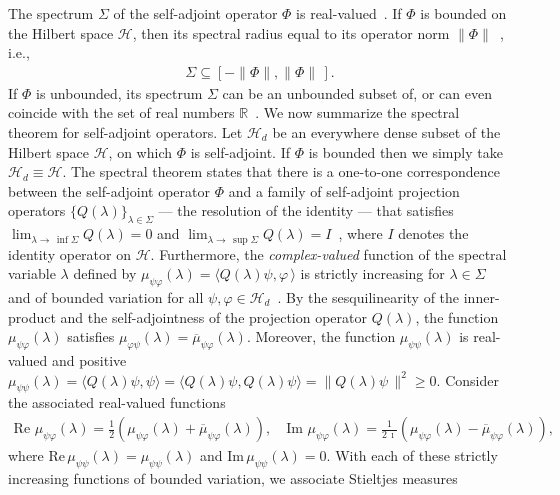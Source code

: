 \documentclass[leqno,onefignum,onetabnum]{siamltex1213}
\newcommand\Real{\mbox{Re}\,} %
\newcommand\Imag{\mbox{Im}\,} %
\newcommand{\Hs}{\mathscr{H}}
\begin{document}
The spectrum $\Sigma$ of the self-adjoint operator $\Phi$ is
real-valued~\cite{Reed-1980,Stone:64}. If $\Phi$ is bounded on the
Hilbert space $\Hs$, then its spectral radius equal to its operator
norm $\|\Phi\|$~\cite{Reed-1980}, i.e.,
%
\begin{align}\label{eq:Spectral_Radius_Phi}
  \Sigma\subseteq[-\|\Phi\|,\|\Phi\|\,].
\end{align}
%
If $\Phi$ is unbounded, its spectrum $\Sigma$ can be an unbounded subset of,
or can even coincide with the set of real numbers
$\mathbb{R}$~\cite{Stone:64}. 
We now summarize the spectral theorem for self-adjoint operators. Let
$\Hs_d$ be an everywhere dense subset of the Hilbert space $\Hs$, on
which $\Phi$ is self-adjoint. If $\Phi$ is 
bounded then we simply take $\Hs_d\equiv\Hs$. The spectral theorem states that
there is a one-to-one correspondence between the self-adjoint
operator $\Phi$ and a family of self-adjoint projection operators
$\{Q(\lambda)\}_{\lambda\in\Sigma}$ --- the resolution of the identity --- that satisfies
$\lim_{\lambda\to\,\inf{\Sigma}}Q(\lambda)=0$ and
$\lim_{\lambda\to\,\sup{\Sigma}}Q(\lambda)=I$~\cite{Stone:64}, where $I$ denotes the 
identity operator on $\Hs$. Furthermore, the \emph{complex-valued}
function of the spectral variable $\lambda$ defined by $\mu_{\psi\varphi}(\lambda)=\langle
Q(\lambda)\psi,\varphi\,\rangle$ is strictly 
increasing for $\lambda\in\Sigma$ and of bounded variation for all
$\psi,\varphi\in\Hs_d$~\cite{Stone:64}. By the sesquilinearity of the
inner-product and the self-adjointness of the projection operator
$Q(\lambda)$, the function $\mu_{\psi\varphi}(\lambda)$ satisfies
$\mu_{\varphi\psi}(\lambda)=\overline{\mu}_{\psi\varphi}(\lambda)$. Moreover, the function $\mu_{\psi\psi}(\lambda)$
is real-valued and positive $\mu_{\psi\psi}(\lambda)=\langle Q(\lambda)\psi,\psi\rangle=\langle
Q(\lambda)\psi,Q(\lambda)\psi\rangle=\|Q(\lambda)\psi\,\|^2\geq0$. 
Consider the associated real-valued functions   
%
\begin{align}\label{eq:Fns_Bounded_Var}
  \Real\,\mu_{\psi\varphi}(\lambda)
         =\frac{1}{2}\left(\mu_{\psi\varphi}(\lambda)+\overline{\mu}_{\psi\varphi}(\lambda)\right), \quad
  \Imag\,\mu_{\psi\varphi}(\lambda)
         =\frac{1}{2\,\imath}\left(\mu_{\psi\varphi}(\lambda)-\overline{\mu}_{\psi\varphi}(\lambda)\right),
\end{align}
%
where $\Real\mu_{\psi\psi}(\lambda)=\mu_{\psi\psi}(\lambda)$ and $\Imag\mu_{\psi\psi}(\lambda)=0$. With each of
these strictly increasing functions of bounded variation, we associate
Stieltjes measures~\cite{Stieltjes:1995,Stone:64,Folland:99:RealAnalysis} 
\end{document}
